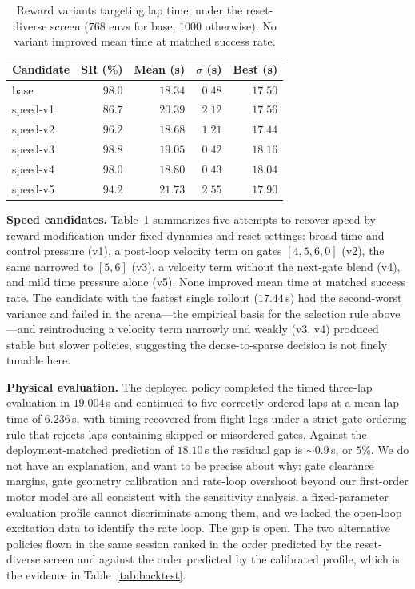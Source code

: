\documentclass[10pt, twocolumn]{article}
\begin{document}
\begin{table}[t]
\centering
\footnotesize
\caption{Reward variants targeting lap time, under the reset-diverse screen
($768$ envs for base, $1000$ otherwise). No variant improved mean time at
matched success rate.}
\label{tab:speed}
\begin{tabular}{@{}l r r r r@{}}
\toprule
Candidate & SR (\%) & Mean (s) & $\sigma$ (s) & Best (s) \\
\midrule
base     & $98.0$ & $\mathbf{18.34}$ & $0.48$ & $17.50$ \\
speed-v1 & $86.7$ & $20.39$ & $2.12$ & $17.56$ \\
speed-v2 & $96.2$ & $18.68$ & $1.21$ & $\mathbf{17.44}$ \\
speed-v3 & $\mathbf{98.8}$ & $19.05$ & $\mathbf{0.42}$ & $18.16$ \\
speed-v4 & $98.0$ & $18.80$ & $0.43$ & $18.04$ \\
speed-v5 & $94.2$ & $21.73$ & $2.55$ & $17.90$ \\
\bottomrule
\end{tabular}
\end{table}

\textbf{Speed candidates.} Table~\ref{tab:speed} summarizes five attempts to
recover speed by reward modification under fixed dynamics and reset settings:
broad time and control pressure (v1), a post-loop velocity term on gates
$[4,5,6,0]$ (v2), the same narrowed to $[5,6]$ (v3), a velocity term without
the next-gate blend (v4), and mild time pressure alone (v5). None improved mean
time at matched success rate. The candidate with the fastest single rollout
($17.44$\,s) had the second-worst variance and failed in the arena---the
empirical basis for the selection rule above---and reintroducing a velocity
term narrowly and weakly (v3, v4) produced stable but slower policies,
suggesting the dense-to-sparse decision is not finely tunable here.

\textbf{Physical evaluation.} The deployed policy completed the timed three-lap
evaluation in $\mathbf{19.004}$\,s and continued to five correctly ordered laps
at a mean lap time of $6.236$\,s, with timing recovered from flight logs under
a strict gate-ordering rule that rejects laps containing skipped or misordered
gates. Against the deployment-matched prediction of $18.10$\,s the residual gap
is ${\sim}0.9$\,s, or $5\%$. We do not have an explanation, and want to be
precise about why: gate clearance margins, gate geometry calibration and
rate-loop overshoot beyond our first-order motor model are all consistent with
the sensitivity analysis, a fixed-parameter evaluation profile cannot
discriminate among them, and we lacked the open-loop excitation data to identify
the rate loop. The gap is open. The two alternative policies flown in the same
session ranked in the order predicted by the reset-diverse screen and against
the order predicted by the calibrated profile, which is the evidence in
Table~\ref{tab:backtest}.
\end{document}
